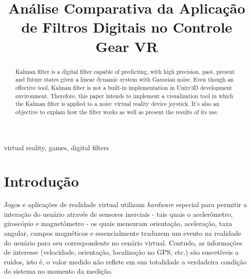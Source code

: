 \documentclass[conference]{IEEEtran}
\begin{document}
\title{Análise Comparativa da Aplicação de Filtros Digitais no Controle Gear VR}

\author{
}

\maketitle

\begin{abstract}
Kalman filter is a digital filter capable of predicting, with high precision, past, present and future states given a linear dynamic system with Gaussian noise. Even though an effective tool, Kalman filter is not a built-in implementation in Unity3D development environment. Therefore, this paper intends to implement  a visualization tool in which the Kalman filter is applied to a noisy virtual reality device joystick. It's also an objective to explain how the filter works as well as present the results of its use.
\end{abstract}

\begin{IEEEkeywords}
virtual reality, games, digital filters
\end{IEEEkeywords}

\section{Introdução}
Jogos e aplicações de realidade virtual utilizam \textit{hardware} especial para permitir a interação do usuário através de sensores inerciais - tais quais o acelerômetro, giroscópio e magnetômetro - os quais mensuram orientação, aceleração, taxa angular, campos magnéticos e essencialmente traduzem um evento na realidade do usuário para seu correspondente no cenário virtual. Contudo, as informações de interesse (velocidade, orientação, localização no GPS, etc.) são suscetíveis a ruídos, isto é, o valor medido não reflete em sua totalidade a verdadeira condição do sistema no momento da medição.
\end{document}
